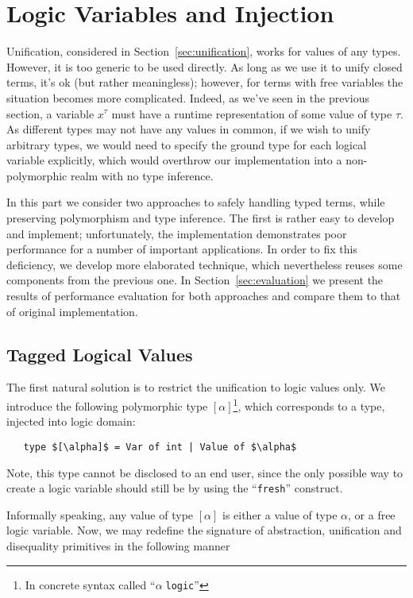 \section{Logic Variables and Injection}
\label{sec:injection}

Unification, considered in Section~\ref{sec:unification}, works for values of any types. However, it
is too generic to be used directly. As long as we use it to unify closed terms, it's ok (but rather meaningless); 
however, for terms with free variables the situation becomes more complicated. Indeed, as we've seen in the
previous section, a variable $x^\tau$ must have a runtime representation of some value of type $\tau$. As different
types may not have any values in common, if we wish to unify arbitrary types, we would need to specify the 
ground type for each logical variable explicitly, which would overthrow our implementation into a non-polymorphic 
realm with no type inference.

In this part we consider two approaches to safely handling typed terms, while preserving polymorphism and
type inference. The first is rather easy to develop and implement; unfortunately, the implementation demonstrates 
poor performance for a number of important applications. In order to fix this deficiency, we develop more 
elaborated technique, which nevertheless reuses some components from the previous one. In Section~\ref{sec:evaluation}
we present the results of performance evaluation for both approaches and compare them to that of original 
implementation.

\subsection{Tagged Logical Values}

The first natural solution is to restrict the unification to logic values only. We introduce the following polymorphic
type $[\alpha]$\footnote{In concrete syntax called ``$\alpha\;$\lstinline{logic}''}, which corresponds to a type, injected into
logic domain:

\begin{lstlisting}
   type $[\alpha]$ = Var of int | Value of $\alpha$
\end{lstlisting}

Note, this type cannot be disclosed to an end user, since the only possible way to create a logic variable should 
still be by using the ``\lstinline{fresh}'' construct.

Informally speaking, any value of type $[\alpha]$ is either a value of type $\alpha$, or a free
logic variable. Now, we may redefine the signature of abstraction, unification and disequality primitives in the
following manner

